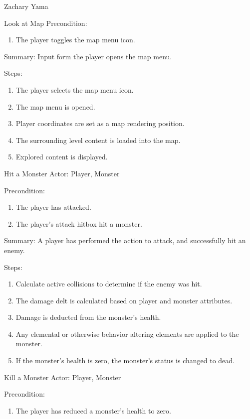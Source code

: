 \documentclass[12pt]{report}
\begin{document}
\begin{section}{Zachary Yama}
\begin{subsection}{Look at Map}
Precondition:
\begin{enumerate}
\item The player toggles the map menu icon.
\end{enumerate}

Summary: Input form the player opens the map menu.

Steps:
\begin{enumerate}
\item The player selects the map menu icon.
\item The map menu is opened.
\item Player coordinates are set as a map rendering position.
\item The surrounding level content is loaded into the map.
\item Explored content is displayed.
\end{enumerate}
\end{subsection}

\begin{subsection}{Hit a Monster}
Actor: Player, Monster

Precondition:
\begin{enumerate}
\item The player has attacked.
\item The player's attack hitbox hit a monster.
\end{enumerate}

Summary: A player has performed the action to attack, and successfully hit
an enemy.

Steps:
\begin{enumerate}
\item Calculate active collisions to determine if the enemy was hit.
\item The damage delt is calculated based on player and monster attributes.
\item Damage is deducted from the monster's health. 
\item Any elemental or otherwise behavior altering elements are applied to
the monster.
\item  If the monster's health is zero, the monster's status is changed to
dead.
\end{enumerate}
\end{subsection}

\begin{subsection}{Kill a Monster}
Actor: Player, Monster

Precondition:
\begin{enumerate}
\item The player has reduced a monster's health to zero.
\end{enumerate}


\end{subsection}
\end{section}
\end{document}
